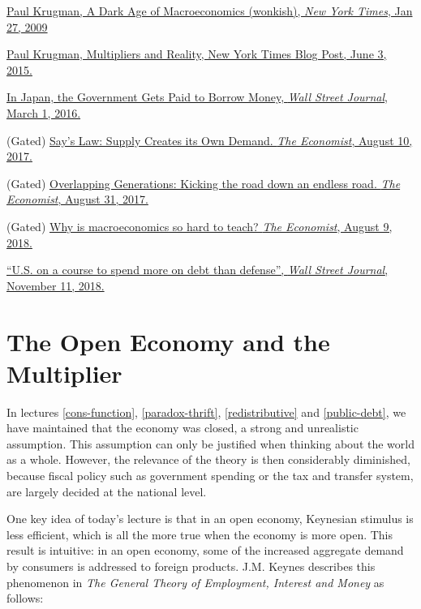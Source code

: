 \documentclass[]{book}
\begin{document}
\href{https://search.proquest.com/docview/1930920374/1A771BC8177A4FB7PQ/1?accountid=14512}{Paul
Krugman, A Dark Age of Macroeconomics (wonkish), \emph{New York Times},
Jan 27, 2009}

\href{https://krugman.blogs.nytimes.com/2015/06/03/multipliers-and-reality/}{Paul
Krugman, Multipliers and Reality, New York Times Blog Post, June 3,
2015.}

\href{https://search.proquest.com/docview/1768757479/E1052F8FA6974859PQ/1?accountid=14512}{In
Japan, the Government Gets Paid to Borrow Money, \emph{Wall Street
Journal}, March 1, 2016.}

(Gated)
\href{https://www.economist.com/economics-brief/2017/08/10/says-law-supply-creates-its-own-demand}{Say's
Law: Supply Creates its Own Demand. \emph{The Economist}, August 10,
2017.}

(Gated)
\href{https://www.economist.com/economics-brief/2017/08/31/kicking-the-can-down-an-endless-road}{Overlapping
Generations: Kicking the road down an endless road. \emph{The
Economist}, August 31, 2017.}

(Gated)
\href{https://www.economist.com/finance-and-economics/2018/08/09/why-is-macroeconomics-so-hard-to-teach}{Why
is macroeconomics so hard to teach? \emph{The Economist}, August 9,
2018.}

\href{https://search.proquest.com/docview/2131663609/B6DB7A44958C4606PQ/1?accountid=14512}{``U.S.
on a course to spend more on debt than defense'', \emph{Wall Street
Journal}, November 11, 2018.}

\chapter{The Open Economy and the Multiplier}\label{open}

In lectures \ref{cons-function}, \ref{paradox-thrift},
\ref{redistributive} and \ref{public-debt}, we have maintained that the
economy was closed, a strong and unrealistic assumption. This assumption
can only be justified when thinking about the world as a whole. However,
the relevance of the theory is then considerably diminished, because
fiscal policy such as government spending or the tax and transfer
system, are largely decided at the national level.

One key idea of today's lecture is that in an open economy, Keynesian
stimulus is less efficient, which is all the more true when the economy
is more open. This result is intuitive: in an open economy, some of the
increased aggregate demand by consumers is addressed to foreign
products. J.M. Keynes describes this phenomenon in \emph{The General
Theory of Employment, Interest and Money} as follows:
\end{document}
